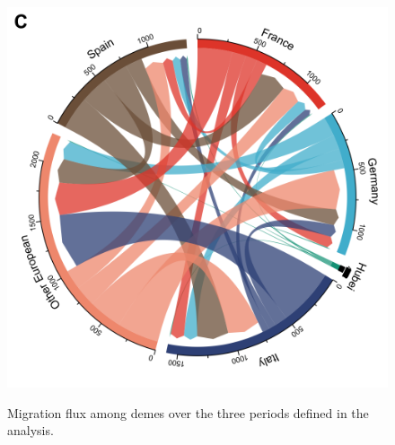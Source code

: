\documentclass[12pt,]{article}
\begin{document}
\begin{figure}[!tbp]
\begin{minipage}[t]{0.4\textwidth}
  \label{fig:migs2}
  \end{minipage}
  \begin{minipage}[t]{0.4\textwidth}
  \includegraphics[width=\textwidth]{201014_europe2_figtraj08c.png}
  \label{fig:migs3}
  \end{minipage}
  \caption{Migration flux among demes over the three periods defined in the analysis.}
  \label{fig:migs}
\end{figure}
\end{document}
